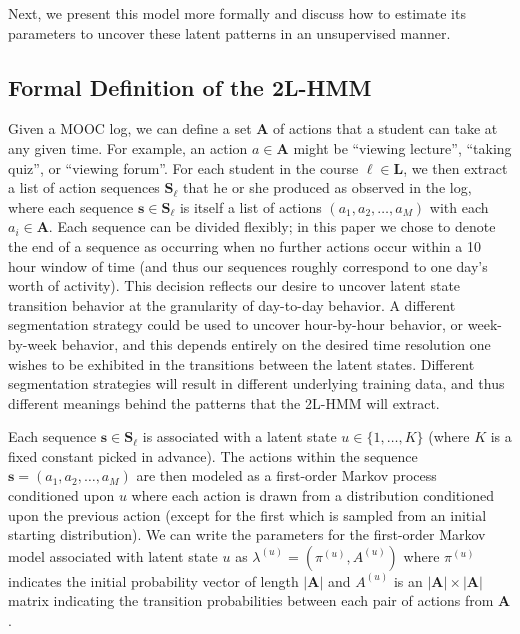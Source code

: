 Next, we present this model more formally and discuss how to
estimate its parameters to uncover these latent patterns in an unsupervised
manner.

\subsection{Formal Definition of the 2L-HMM}

Given a MOOC log, we can define a set $\mathbf{A}$ of actions that a
student can take at any given time. For example, an action $a \in
\mathbf{A}$ might be ``viewing lecture'', ``taking quiz'', or ``viewing
forum''. For each student in the course $\ell \in \mathbf{L}$, we then
extract a list of action sequences $\mathbf{S}_\ell$ that he or she
produced as observed in the log, where each sequence $\mathbf{s} \in
\mathbf{S}_\ell$ is itself a list of actions $(a_1, a_2, \ldots, a_M)$ with
each $a_i \in \mathbf{A}$.  Each sequence can be divided flexibly; in this
paper we chose to denote the end of a sequence as occurring when no further
actions occur within a 10 hour window of time (and thus our sequences
roughly correspond to one day's worth of activity). This decision reflects
our desire to uncover latent state transition behavior at the granularity
of day-to-day behavior. A different segmentation strategy could be used to
uncover hour-by-hour behavior, or week-by-week behavior, and this depends
entirely on the desired time resolution one wishes to be exhibited in the
transitions between the latent states. Different segmentation strategies
will result in different underlying training data, and thus different
meanings behind the patterns that the 2L-HMM will extract.

Each sequence $\mathbf{s} \in \mathbf{S}_\ell$ is associated with a latent
state $u \in \{1,\ldots,K\}$ (where $K$ is a fixed constant picked in
advance). The actions within the sequence $\mathbf{s} = (a_1, a_2, \ldots,
a_M)$ are then modeled as a first-order Markov process conditioned upon $u$
where each action is drawn from a distribution conditioned upon the
previous action (except for the first which is sampled from an initial
starting distribution). We can write the parameters for the first-order
Markov model associated with latent state $u$ as $\lambda^{(u)} =
(\pi^{(u)}, A^{(u)})$ where $\pi^{(u)}$ indicates the initial probability
vector of length $|\mathbf{A}|$ and $A^{(u)}$ is an $|\mathbf{A}| \times
|\mathbf{A}|$ matrix indicating the transition probabilities between each
pair of actions from $\mathbf{A}$.

